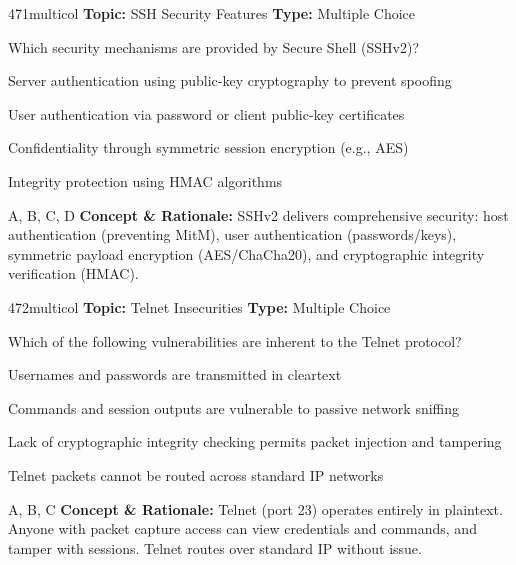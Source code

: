 \begin{qcard}{471}{multicol}
\textcolor{darkslate!75}{\small\textbf{Topic:} SSH Security Features \hfill \textbf{Type:} Multiple Choice}\vspace{0.4em}\par
Which security mechanisms are provided by Secure Shell (SSHv2)?
\begin{qoptions}
\item Server authentication using public-key cryptography to prevent spoofing
\item User authentication via password or client public-key certificates
\item Confidentiality through symmetric session encryption (e.g., AES)
\item Integrity protection using HMAC algorithms
\end{qoptions}
\end{qcard}
\nopagebreak
\begin{explainbox}{A, B, C, D}
\textbf{Concept \& Rationale:} SSHv2 delivers comprehensive security: host authentication (preventing MitM), user authentication (passwords/keys), symmetric payload encryption (AES/ChaCha20), and cryptographic integrity verification (HMAC).
\end{explainbox}

\begin{qcard}{472}{multicol}
\textcolor{darkslate!75}{\small\textbf{Topic:} Telnet Insecurities \hfill \textbf{Type:} Multiple Choice}\vspace{0.4em}\par
Which of the following vulnerabilities are inherent to the Telnet protocol?
\begin{qoptions}
\item Usernames and passwords are transmitted in cleartext
\item Commands and session outputs are vulnerable to passive network sniffing
\item Lack of cryptographic integrity checking permits packet injection and tampering
\item Telnet packets cannot be routed across standard IP networks
\end{qoptions}
\end{qcard}
\nopagebreak
\begin{explainbox}{A, B, C}
\textbf{Concept \& Rationale:} Telnet (port 23) operates entirely in plaintext. Anyone with packet capture access can view credentials and commands, and tamper with sessions. Telnet routes over standard IP without issue.
\end{explainbox}

